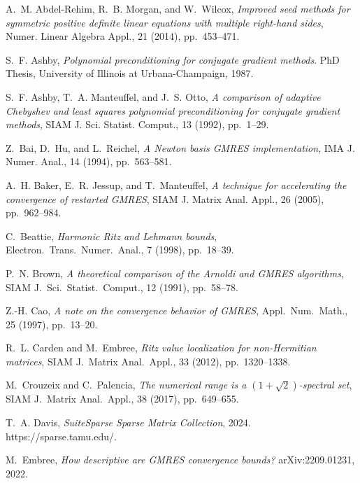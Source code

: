 \documentclass{siamart}
\begin{document}
\begin{thebibliography}{10}

{\sc A.~M. Abdel-Rehim, R.~B. Morgan, and W.~Wilcox}, {\em Improved seed
  methods for symmetric positive definite linear equations with multiple
  right-hand sides}, Numer. Linear Algebra Appl., 21 (2014), pp.~453--471.

{\sc S.~F. Ashby}, {\em Polynomial preconditioning for conjugate gradient
  methods}.
\newblock PhD Thesis, University of Illinois at Urbana-Champaign, 1987.

{\sc S.~F. Ashby, T.~A. Manteuffel, and J.~S. Otto}, {\em A comparison of
  adaptive {C}hebyshev and least squares polynomial preconditioning for
  conjugate gradient methods}, SIAM J. Sci. Statist. Comput., 13 (1992),
  pp.~1--29.

{\sc Z.~Bai, D.~Hu, and L.~Reichel}, {\em A {N}ewton basis {GMRES}
  implementation}, IMA J. Numer. Anal., 14 (1994), pp.~563--581.

{\sc A.~H. Baker, E.~R. Jessup, and T.~Manteuffel}, {\em A technique for
  accelerating the convergence of restarted {GMRES}}, SIAM J. Matrix Anal.
  Appl., 26 (2005), pp.~962--984.

{\sc C.~Beattie}, {\em Harmonic {Ritz} and {Lehmann} bounds}, Electron.\
  Trans.\ Numer.\ Anal., 7 (1998), pp.~18--39.

{\sc P.~N. Brown}, {\em A theoretical comparison of the {Arnoldi} and {GMRES}
  algorithms}, SIAM J.~Sci.\ Statist.\ Comput., 12 (1991), pp.~58--78.

{\sc Z.-H. Cao}, {\em A note on the convergence behavior of {GMRES}}, Appl.\
  Num.\ Math., 25 (1997), pp.~13--20.

{\sc R.~L. Carden and M.~Embree}, {\em {Ritz} value localization for
  non-{Hermitian} matrices}, SIAM J.~Matrix Anal.\ Appl., 33 (2012),
  pp.~1320--1338.

{\sc M.~Crouzeix and C.~Palencia}, {\em The numerical range is a
  $(1+\sqrt{2})$-spectral set}, SIAM J.~Matrix Anal.\ Appl., 38 (2017),
  pp.~649--655.

{\sc T.~A. Davis}, {\em {SuiteSparse} {Sparse} {Matrix} {Collection}}, 2024.
\newblock https://sparse.tamu.edu/.

{\sc M.~Embree}, {\em How descriptive are {GMRES} convergence bounds?}
\newblock arXiv:2209.01231, 2022.


\end{thebibliography}
\end{document}
